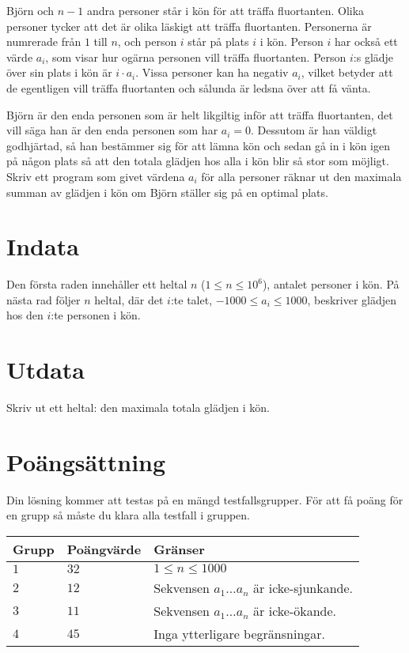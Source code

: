 Björn och $n-1$ andra personer står i kön för att träffa fluortanten. Olika personer tycker att det är olika läskigt att träffa fluortanten. Personerna är numrerade från $1$ till $n$, och person $i$ står på plats $i$ i kön. Person $i$ har också ett värde $a_i$, som visar hur ogärna personen vill träffa fluortanten. Person $i$:s glädje över sin plats i kön är $i \cdot a_i$. Vissa personer kan ha negativ $a_i$,
vilket betyder att de egentligen vill träffa fluortanten och sålunda är ledsna över att få vänta.

Björn är den enda personen som är helt likgiltig inför att träffa fluortanten, det vill säga han är den enda personen som har $a_i = 0$. Dessutom är han väldigt godhjärtad, så han bestämmer sig för att lämna kön och sedan gå in i kön igen på någon plats så att den totala glädjen hos alla i kön blir så stor som möjligt. Skriv ett program som givet värdena $a_i$ för alla personer räknar ut den maximala summan av glädjen i kön om Björn ställer sig på en optimal plats.

\section*{Indata}
Den första raden innehåller ett heltal $n$ ($1 \le n \le 10^6$), antalet personer i kön. På nästa rad följer $n$ heltal, där det $i$:te talet, $-1000 \le a_i \le 1000$, beskriver glädjen hos den $i$:te personen i kön.

\section*{Utdata}
Skriv ut ett heltal: den maximala totala glädjen i kön.

\section*{Poängsättning}
Din lösning kommer att testas på en mängd testfallsgrupper.
För att få poäng för en grupp så måste du klara alla testfall i gruppen.

\noindent
\begin{tabular}{| l | l | p{12cm} |}
  \hline
  Grupp & Poängvärde & Gränser \\ \hline
    $1$   & $32$     & $1 \leq n \leq 1000$ \\ \hline
    $2$   & $12$     & Sekvensen $a_1 \dots a_n$ är icke-sjunkande. \\ \hline
    $3$   & $11$     & Sekvensen $a_1 \dots a_n$ är icke-ökande. \\ \hline
    $4$   & $45$     & Inga ytterligare begränsningar. \\ \hline
\end{tabular}

